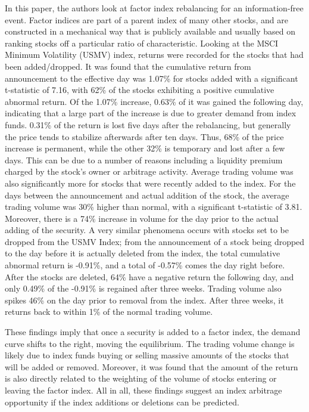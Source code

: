 \documentclass[12pt,twoside]{reedthesis}
\theoremstyle{definition}
\theoremstyle{definition}
\theoremstyle{definition}
\theoremstyle{remark}
\begin{document}
In this paper, the authors look at factor index rebalancing for an
information-free event. Factor indices are part of a parent index of
many other stocks, and are constructed in a mechanical way that is
publicly available and usually based on ranking stocks off a particular
ratio of characteristic. Looking at the MSCI Minimum Volatility (USMV)
index, returns were recorded for the stocks that had been added/dropped.
It was found that the cumulative return from announcement to the
effective day was 1.07\% for stocks added with a significant t-statistic
of 7.16, with 62\% of the stocks exhibiting a positive cumulative
abnormal return. Of the 1.07\% increase, 0.63\% of it was gained the
following day, indicating that a large part of the increase is due to
greater demand from index funds. 0.31\% of the return is lost five days
after the rebalancing, but generally the price tends to stabilize
afterwards after ten days. Thus, 68\% of the price increase is
permanent, while the other 32\% is temporary and lost after a few days.
This can be due to a number of reasons including a liquidity premium
charged by the stock's owner or arbitrage activity. Average trading
volume was also significantly more for stocks that were recently added
to the index. For the days between the announcement and actual addition
of the stock, the average trading volume was 30\% higher than normal,
with a significant t-statistic of 3.81. Moreover, there is a 74\%
increase in volume for the day prior to the actual adding of the
security. A very similar phenomena occurs with stocks set to be dropped
from the USMV Index; from the announcement of a stock being dropped to
the day before it is actually deleted from the index, the total
cumulative abnormal return is -0.91\%, and a total of -0.57\% comes the
day right before. After the stocks are deleted, 64\% have a negative
return the following day, and only 0.49\% of the -0.91\% is regained
after three weeks. Trading volume also spikes 46\% on the day prior to
removal from the index. After three weeks, it returns back to within 1\%
of the normal trading volume.

These findings imply that once a security is added to a factor index,
the demand curve shifts to the right, moving the equilibrium. The
trading volume change is likely due to index funds buying or selling
massive amounts of the stocks that will be added or removed. Moreover,
it was found that the amount of the return is also directly related to
the weighting of the volume of stocks entering or leaving the factor
index. All in all, these findings suggest an index arbitrage opportunity
if the index additions or deletions can be predicted.
\end{document}

